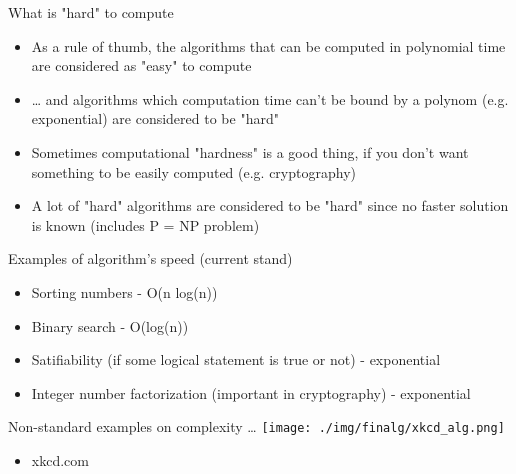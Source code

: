 \documentclass[presentation]{beamer}
\begin{document}
\begin{frame}[label=sec-2-21]{What is "hard" to compute}
\begin{itemize}
\item As a rule of thumb, the algorithms that can be computed in polynomial time are considered as "\alert{easy}" to compute
\item \ldots{} and algorithms which computation time can't be bound by a polynom (e.g. exponential) are considered to be "\alert{hard}"
\item Sometimes computational "hardness" is a good thing, if you don't want something to be easily computed (e.g. cryptography)
\item A lot of "hard" algorithms are considered to be "hard" since no faster solution is known (includes P = NP problem)
\end{itemize}
\end{frame}
\begin{frame}[label=sec-2-22]{Examples of algorithm's speed (current stand)}
\begin{itemize}
\item Sorting numbers - O(n log(n))
\item Binary search - O(log(n))
\item Satifiability (if some logical statement is true or not) - exponential
\item Integer number factorization (important in cryptography) - exponential
\end{itemize}
\end{frame}
\begin{frame}[label=sec-2-23]{Non-standard examples on complexity \ldots{}}
\texttt{[image: ./img/finalg/xkcd\_alg.png]}
\begin{itemize}
\item xkcd.com
\end{itemize}
\end{frame}
\end{document}
